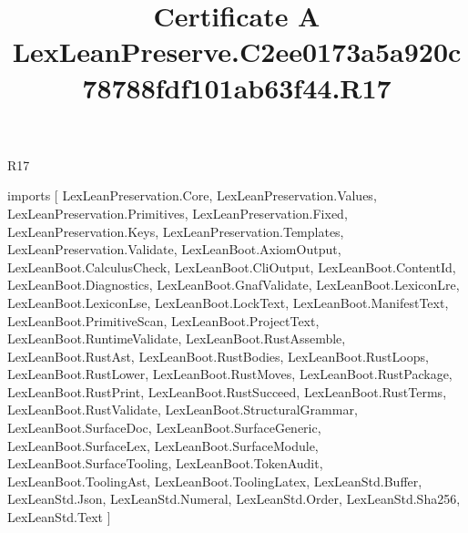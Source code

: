 \begin{lexlean}{R17}
\title{Certificate A LexLeanPreserve.C2ee0173a5a920c78788fdf101ab63f44.R17}
\begin{coremodule}
imports [
  LexLeanPreservation.Core,
  LexLeanPreservation.Values,
  LexLeanPreservation.Primitives,
  LexLeanPreservation.Fixed,
  LexLeanPreservation.Keys,
  LexLeanPreservation.Templates,
  LexLeanPreservation.Validate,
  LexLeanBoot.AxiomOutput,
  LexLeanBoot.CalculusCheck,
  LexLeanBoot.CliOutput,
  LexLeanBoot.ContentId,
  LexLeanBoot.Diagnostics,
  LexLeanBoot.GnafValidate,
  LexLeanBoot.LexiconLre,
  LexLeanBoot.LexiconLse,
  LexLeanBoot.LockText,
  LexLeanBoot.ManifestText,
  LexLeanBoot.PrimitiveScan,
  LexLeanBoot.ProjectText,
  LexLeanBoot.RuntimeValidate,
  LexLeanBoot.RustAssemble,
  LexLeanBoot.RustAst,
  LexLeanBoot.RustBodies,
  LexLeanBoot.RustLoops,
  LexLeanBoot.RustLower,
  LexLeanBoot.RustMoves,
  LexLeanBoot.RustPackage,
  LexLeanBoot.RustPrint,
  LexLeanBoot.RustSucceed,
  LexLeanBoot.RustTerms,
  LexLeanBoot.RustValidate,
  LexLeanBoot.StructuralGrammar,
  LexLeanBoot.SurfaceDoc,
  LexLeanBoot.SurfaceGeneric,
  LexLeanBoot.SurfaceLex,
  LexLeanBoot.SurfaceModule,
  LexLeanBoot.SurfaceTooling,
  LexLeanBoot.TokenAudit,
  LexLeanBoot.ToolingAst,
  LexLeanBoot.ToolingLatex,
  LexLeanStd.Buffer,
  LexLeanStd.Json,
  LexLeanStd.Numeral,
  LexLeanStd.Order,
  LexLeanStd.Sha256,
  LexLeanStd.Text
]


\end{coremodule}
\end{lexlean}
